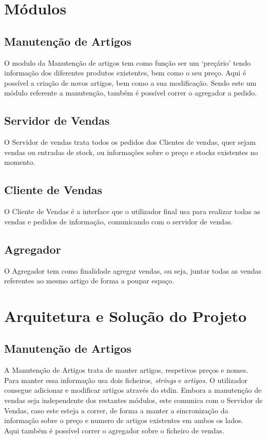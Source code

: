 \documentclass[a4paper]{report}
\begin{document}
\chapter{Módulos}\label{chap:api}

\section{Manutenção de Artigos}

O modulo da Manutenção de artigos tem como função ser um `preçário'
tendo informação dos diferentes produtos existentes, bem como o seu
preço. Aqui é possível a criação de novos artigos, bem como a sua
modificação. Sendo este um módulo referente a manutenção, também
é possível correr o agregador a pedido.

\section{Servidor de Vendas}

O Servidor de vendas trata todos os pedidos dos Clientes de vendas,
quer sejam vendas ou entradas de stock, ou informações sobre o preço
e stocks existentes no momento.

\section{Cliente de Vendas}

O Cliente de Vendas é a interface que o utilizador final usa para
realizar todas as vendas e pedidos de informação, comunicando com
o servidor de vendas.

\section{Agregador}

O Agregador tem como finalidade agregar vendas, ou seja, juntar
todas as vendas referentes ao mesmo artigo de forma a poupar
espaço.

\chapter{Arquitetura e Solução do Projeto}

\section{Manutenção de Artigos}

A Manutenção de Artigos trata de manter artigos, respetivos preços
e nomes. Para manter essa informação usa dois ficheiros, \textit{strings}
e \textit{artigos}. O utilizador consegue adicionar e modificar artigos
através do stdin. Embora a manutenção de vendas seja independente dos 
restantes módulos, este comunica com o Servidor de Vendas, caso este esteja
a correr, de forma a manter a sincronização  da informação sobre o preço 
e numero de artigos existentes em ambos os lados.\\
Aqui também é possível correr o agregador sobre o ficheiro de vendas.
\end{document}
